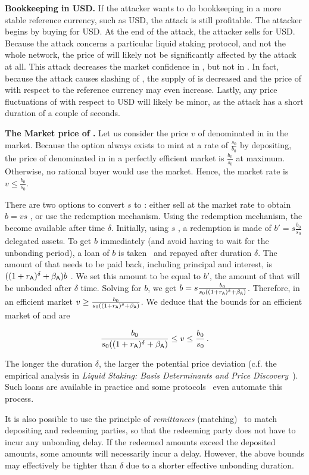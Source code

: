 \noindent
\textbf{Bookkeeping in USD.}
If the attacker wants to do bookkeeping in a more stable reference currency,
such as USD, the attack is still profitable. The attacker begins by buying
\asset for USD. At the end of the attack, the attacker sells \asset for USD.
Because the attack concerns a particular liquid staking protocol, and
not the whole \asset network, the price of \asset will likely not
be significantly affected by the attack at all.
This attack decreases the market confidence in \stasset,
but not in \asset.
In fact, because
the attack causes slashing of \asset, the supply of \asset is decreased
and the price of \asset with respect to the reference currency may
even increase.
Lastly, any price fluctuations of \asset with respect to USD will likely be
minor, as the attack has a short duration of a couple of seconds.

\noindent
\textbf{The Market price of \stasset.}\label{sec:stasset-price}
Let us consider the price $v$ of \stasset denominated in \asset in the market.
Because the option always exists to mint at a rate of $\frac{s_0}{b_0}$ by
depositing, the price of \stasset denominated in \asset in a perfectly
efficient market is $\frac{b_0}{s_0}$ at maximum. Otherwise, no
rational buyer would use the market. Hence, the market rate is
$v \leq \frac{b_0}{s_0}$.

There are two options to convert $s$ \stasset to \asset: either sell
at the market rate to obtain $b = v s$ \asset, or use the redemption mechanism.
Using the redemption mechanism, the \assets become available after
time $\delta$.
Initially, using $s$ \stasset, a redemption is made of $b' = s \frac{b_0}{s_0}$
delegated assets. To get $b$ \asset immediately (and avoid having to wait
for the unbonding period), a loan of $b$ \asset is taken~\cite[p.~13]{liquid-staking-report} and
repayed after duration $\delta$.
The amount of \asset that needs to be paid back,
including principal and interest, is $((1 + r_{\textsf{A}})^\delta + \beta_{\textsf{A}})b$ \asset.
We set this amount to be equal to $b'$, the amount of \assets that will be
unbonded after $\delta$ time. Solving for $b$, we get
$b = s \frac{b_0}{s_0 ((1 + r_{\textsf{A}})^\delta + \beta_{\textsf{A}})}$.
Therefore, in an efficient market $v \geq \frac{b_0}{s_0 ((1 + r_{\textsf{A}})^\delta + \beta_{\textsf{A}})}$.
We deduce that the bounds for an efficient market of \asset and \stasset are

\[
  \frac{b_0}{s_0 ((1 + r_{\textsf{A}})^\delta + \beta_{\textsf{A}})} \leq v \leq \frac{b_0}{s_0}\,.
\]

The longer the duration $\delta$, the larger the potential price deviation
(c.f. the empirical analysis in
\emph{Liquid Staking: Basis Determinants and Price Discovery}~\cite{scharnowski2022liquid}).
Such loans are available in practice and some
protocols~\cite[\S5]{parallel}\cite{marinade-matching} even automate this process.

It is also possible to use the principle of \emph{remittances}
(matching)~\cite[\S5]{parallel}\cite{marinade-matching} to match depositing and
redeeming parties, so that the redeeming party does not have to incur any unbonding delay.
If the redeemed amounts exceed the deposited amounts, some amounts will necessarily incur
a delay. However, the above bounds may effectively be tighter than $\delta$ due to
a shorter effective unbonding duration.
